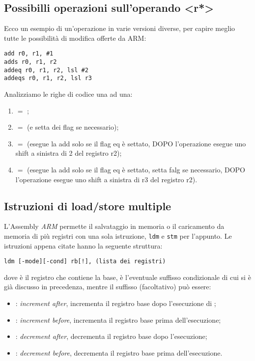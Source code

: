 \documentclass[class=book, crop=false, oneside]{standalone}
\begin{document}
\subsection{Possibilli operazioni sull'operando <r*>}\label{sec:modifiche}
Ecco un esempio di un'operazione in varie versioni diverse, per capire meglio tutte le possibilità di modifica offerte da ARM:
\begin{verbatim}
add r0, r1, #1
adds r0, r1, r2
addeq r0, r1, r2, lsl #2
addeqs r0, r1, r2, lsl r3
\end{verbatim}
Analizziamo le righe di codice una ad una:
\begin{enumerate}
	\item {} \(=\) ;
	\item {} \(=\)  (e setta dei flag se necessario);
	\item {} \(=\)  (esegue la add solo se il flag eq è settato, DOPO l'operazione esegue uno shift a sinistra di 2 del registro r2);
	\item {} \(=\)  (esegue la add solo se il flag eq è settato, setta falg se necessario, DOPO l'operazione esegue uno shift a sinistra di r3 del registro r2).
\end{enumerate}

\subsection*{Istruzioni di load/store multiple}
L'Assembly \emph{ARM} permette il salvataggio in memoria o il caricamento da memoria di più registri con una sola istruzione, \texttt{ldm} e \texttt{stm} per l'appunto. Le istruzioni appena citate hanno la seguente struttura:
\begin{center}
	\texttt{ldm [-mode][-cond] rb[!], (lista dei registri)}
\end{center}
dove  è il registro che contiene la base,  è l'eventuale suffisso condizionale di cui si è già discusso in precedenza, mentre il suffisso (facoltativo)  può essere:
\begin{itemize}
	\item {}: \emph{increment after}, incrementa il registro base dopo l'esecuzione di ;
	\item {}: \emph{increment before}, incrementa il registro base prima dell'esecuzione;
	\item {}: \emph{decrement after}, decrementa il registro base dopo l'esecuzione;
	\item {}: \emph{decrement before}, decrementa il registro base prima dell'esecuzione.
\end{itemize}
\end{document}
